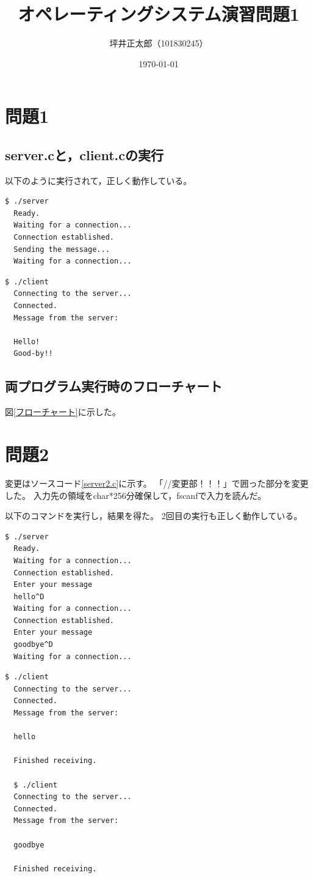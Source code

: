 \documentclass[a4paper,10pt]{jsarticle}
\begin{document}
\title{オペレーティングシステム演習問題1}
\author{坪井正太郎（101830245）}
\date{\today}
\maketitle
\section{問題1}
\subsection{server.cと，client.cの実行}
以下のように実行されて，正しく動作している。
\begin{lstlisting}[caption={server実行結果},label={server1}]
  $ ./server
  Ready.
  Waiting for a connection...
  Connection established.
  Sending the message...
  Waiting for a connection...
\end{lstlisting}

\begin{lstlisting}[caption={client実行結果},label={client1}]
  $ ./client
  Connecting to the server...
  Connected.
  Message from the server:

  Hello!
  Good-by!!
\end{lstlisting}


\subsection{両プログラム実行時のフローチャート}
図\ref{フローチャート}に示した。


\section{問題2}
変更はソースコード\ref{server2.c}に示す。
「//変更部！！！」で囲った部分を変更した。
入力先の領域をchar*256分確保して，fscanfで入力を読んだ。

以下のコマンドを実行し，結果を得た。
2回目の実行も正しく動作している。
\begin{lstlisting}[caption={server2},label={server2}]
  $ ./server
  Ready.
  Waiting for a connection...
  Connection established.
  Enter your message
  hello^D
  Waiting for a connection...
  Connection established.
  Enter your message
  goodbye^D
  Waiting for a connection...  
\end{lstlisting}

\begin{lstlisting}[caption={client},label={client2}]
  $ ./client
  Connecting to the server...
  Connected.
  Message from the server:

  hello

  Finished receiving.

  $ ./client
  Connecting to the server...
  Connected.
  Message from the server:

  goodbye

  Finished receiving.
\end{lstlisting}
\end{document}
